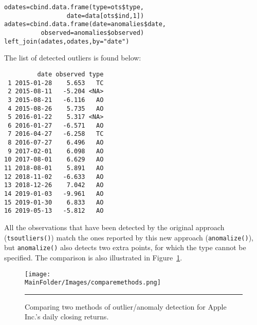 \begin{Example}
\begin{lstlisting}
odates=cbind.data.frame(type=ots$type,
                 date=data[ots$ind,1])
adates=cbind.data.frame(date=anomalies$date,
          observed=anomalies$observed)
left_join(adates,odates,by="date")
\end{lstlisting}
The list of detected outliers is found below:
\begin{verbatim}
         date observed type
 1 2015-01-28    5.653   TC
 2 2015-08-11   -5.204 <NA>
 3 2015-08-21   -6.116   AO
 4 2015-08-26    5.735   AO
 5 2016-01-22    5.317 <NA>
 6 2016-01-27   -6.571   AO
 7 2016-04-27   -6.258   TC
 8 2016-07-27    6.496   AO
 9 2017-02-01    6.098   AO
10 2017-08-01    6.629   AO
11 2018-08-01    5.891   AO
12 2018-11-02   -6.633   AO
13 2018-12-26    7.042   AO
14 2019-01-03   -9.961   AO
15 2019-01-30    6.833   AO
16 2019-05-13   -5.812   AO
\end{verbatim}
All the observations that have been detected by the original approach (\verb|tsoutliers()|) match the ones reported by this new approach (\verb|anomalize()|), but \verb|anomalize()| also detects two extra points, for which the type cannot be specified. The comparison is also illustrated in Figure~\ref{fig:comparemethods}.
\begin{figure}[t]
\centering
\texttt{[image: \\MainFolder/Images/comparemethods.png]}
\caption{\small Comparing two methods of outlier/anomaly detection for Apple Inc.'s  daily closing returns.}
\hrule\label{fig:comparemethods}
\end{figure}
\end{Example}\afterpage{\FloatBarrier}

